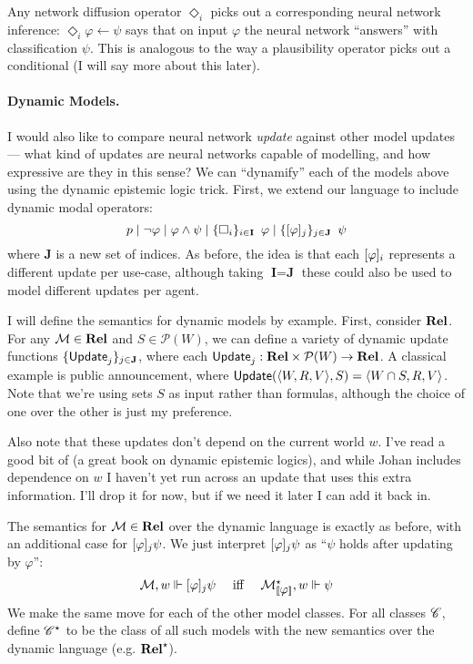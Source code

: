 \documentclass[letterpaper]{article}
\begin{document}
Any network diffusion operator $\Diamond_i$ picks out a corresponding neural network inference: $\Diamond_i \varphi \leftarrow \psi$ says that on input $\varphi$ the neural network ``answers'' with classification $\psi$.  This is analogous to the way a plausibility operator picks out a conditional (I will say more about this later).

\paragraph*{Dynamic Models.}

I would also like to compare neural network \emph{update} against other model updates --- what kind of updates are neural networks capable of modelling, and how expressive are they in this sense?  We can ``dynamify'' each of the models above using the dynamic epistemic logic trick.  First, we extend our language to include dynamic modal operators:
\[
    p \mid \neg \varphi \mid \varphi \land \psi \mid \{ \Box_i \}_{i \in \textbf{I}} \hspace*{0.5em} \varphi \mid \{ [\varphi]_j \}_{j \in \textbf{J}} \hspace*{0.5em} \psi
\]
where \textbf{J} is a new set of indices.  As before, the idea is that each $[\varphi]_i$ represents a different update per use-case, although taking $\textbf{I} = \textbf{J}$ these could also be used to model different updates per agent.  

I will define the semantics for dynamic models by example.  First, consider $\textrm{\textbf{Rel}}$.  For any $\mathcal{M} \in \textrm{\textbf{Rel}}$ and $S \in \mathcal{P}(W)$, we can define a variety of dynamic update functions $\{ \mathsf{Update}_j \}_{j \in \textbf{J}}$, where each $\mathsf{Update}_j : \textrm{\textbf{Rel}} \times \mathcal{P}(W) \to \textrm{\textbf{Rel}}$.  A classical example is public announcement, where $\mathsf{Update}(\langle W, R, V \rangle, S) = \langle W \cap S, R, V \rangle$.  Note that we're using sets $S$ as input rather than formulas, although the choice of one over the other is just my preference.

Also note that these updates don't depend on the current world $w$.  I've read a good bit of \cite{van2011logicaldynamics} (a great book on dynamic epistemic logics), and while Johan includes dependence on $w$ I haven't yet run across an update that uses this extra information.  I'll drop it for now, but if we need it later I can add it back in.

The semantics for $\mathcal{M} \in \textrm{\textbf{Rel}}$ over the dynamic language is exactly as before, with an additional case for $[\varphi]_j \psi$.  We just interpret $[\varphi]_j \psi$ as ``$\psi$ holds after updating by $\varphi$'':
\[
\begin{array}{lcl}
    \mathcal{M}, w \Vdash [\varphi]_j \psi & \mbox{ iff } & \mathcal{M}^\star_{[\![\mbox{\em $ \varphi $\/}]\!]}, w \Vdash \psi
\end{array}
\]
We make the same move for each of the other model classes.  For all classes $\mathscr{C}$, define $\mathscr{C}^\star$ to be the class of all such models with the new semantics over the dynamic language (e.g. $\textrm{\textbf{Rel}}^\star$).
\end{document}
